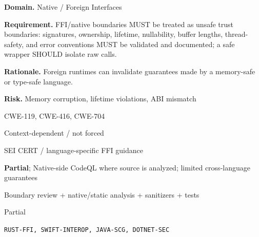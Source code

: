 \documentclass[10pt,letterpaper]{article}
\newcommand{\prioritybadge}[2]{\tcbox[on line,boxrule=0pt,arc=1.2mm,boxsep=0.7mm,left=1mm,right=1mm,top=0.4mm,bottom=0.4mm,colback=#2!12,coltext=#2]{\scriptsize\bfseries #1}}
\begin{document}
\begin{rulebox}[title={\texttt{SCS-ALL-FFI-001} \hfill \prioritybadge{Critical Control}{Critical}}]
\textbf{Domain.} Native / Foreign Interfaces

\textbf{Requirement.} FFI/native boundaries MUST be treated as unsafe trust boundaries: signatures, ownership, lifetime, nullability, buffer lengths, thread-safety, and error conventions MUST be validated and documented; a safe wrapper SHOULD isolate raw calls.

\textbf{Rationale.} Foreign runtimes can invalidate guarantees made by a memory-safe or type-safe language.

\textbf{Risk.} Memory corruption, lifetime violations, ABI mismatch

\begin{description}[leftmargin=2.65cm,labelwidth=2.3cm,style=nextline,itemsep=1pt,topsep=3pt]
  \item[CWE] CWE-119, CWE-416, CWE-704
  \item[OWASP] Context-dependent / not forced
  \item[CERT] SEI CERT / language-specific FFI guidance
  \item[CodeQL] \textbf{Partial}; Native-side CodeQL where source is analyzed; limited cross-language guarantees
  \item[Enforcement] Boundary review + native/static analysis + sanitizers + tests
  \item[Automation] Partial
  \item[Sources] \texttt{RUST-FFI, SWIFT-INTEROP, JAVA-SCG, DOTNET-SEC}
\end{description}
\end{rulebox}
\end{document}
